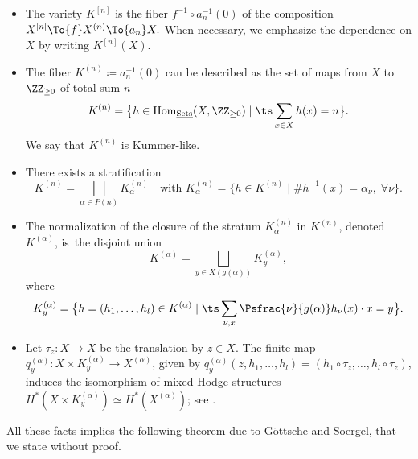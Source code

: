 \begin{itemize}
\item The variety $K^{[n]}$ is the fiber $f^{-1} \circ a^{-1}_n(0)$ of the composition
$
X^{[n]} \To{f} X^{(n)} \To{a_n} X.
$
When necessary, we emphasize the dependence on $X$ by writing $K^{[n]}(X)$.
\item The fiber $K^{(n)} \coloneqq a_n^{-1}(0)$ can be described as the set of maps from $X$ to $\ZZ_{\geq 0}$ of total sum $n$
\[
K^{(n)} = \big\{ h \in \mathrm{Hom}_{\underline{\mathrm{Sets}}}(X, \ZZ_{\geq 0}) \mid\ts\sum_{x \in X} h(x)=n \big\}.
\]
We say that $K^{(n)}$ is Kummer-like.
\item There exists a stratification
\[
K^{(n)} = \bigsqcup_{\alpha \in P(n)} K^{(n)}_{\alpha}\quad \text{with }
K^{(n)}_{\alpha} = \big\{ h \in K^{(n)} \mid  \# h^{-1}(x)= \alpha_{\nu},\; \forall \nu \big\}.
\]
\item The normalization of the closure of the stratum $K^{(n)}_{\alpha}$ in $K^{(n)}$, denoted $K^{(\alpha)}$, is~the disjoint union
\[
K^{(\alpha)}= \bigsqcup_{y \in X(g(\alpha))} K^{(\alpha)}_y,
\]
where
\[
K^{(\alpha)}_y = \big\{ h =(h_1, \ldots, h_l) \in K^{(\alpha)} \mid  \ts\sum_{\nu, x} \Psfrac{\nu}{g(\alpha)}h_{\nu}(x) \cdot x=y\big\}.
\]
\item Let $\tau_{z}\colon X \to X$ be the translation by $z \in X$. The finite map $q^{(\alpha)}_y\colon X \times K^{(\alpha)}_y \to X^{(\alpha)}$, given by $q^{(\alpha)}_y(z, h_1,\ldots, h_l)=(h_1 \circ \tau_z, \ldots, h_l \circ \tau_z)$, induces the isomorphism of mixed Hodge structures $H^*(X \times K^{(\alpha)}_y) \simeq H^*(X^{(\alpha)})$; see \cite[p.\,243]{GottscheSoergel93}.
\end{itemize}
All these facts implies the following theorem due to Göttsche and Soergel, that we state without proof.
\Changelback

